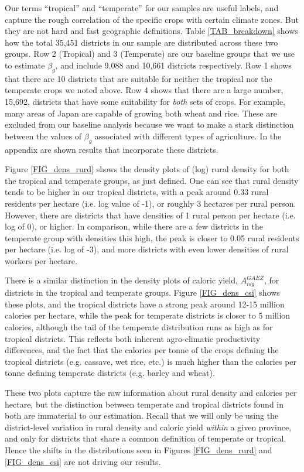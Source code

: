 \documentclass[11pt]{article}
\begin{document}
Our terms ``tropical'' and ``temperate'' for our samples are useful labels, and capture the rough correlation of the specific crops with certain climate zones. But they are not hard and fast geographic definitions. Table \ref{TAB_breakdown} shows how the total 35,451 districts in our sample are distributed across these two groups. Row 2 (Tropical) and 3 (Temperate) are our baseline groups that we use to estimate $\beta_g$, and include 9,088 and 10,661 districts respectively. Row 1 shows that there are 10 districts that are suitable for neither the tropical nor the temperate crops we noted above. Row 4 shows that there are a large number, 15,692, districts that have some suitability for \textit{both} sets of crops. For example, many areas of Japan are capable of growing both wheat and rice. These are excluded from our baseline analysis because we want to make a stark distinction between the values of $\beta_g$ associated with different types of agriculture. In the appendix are shown results that incorporate these districts.

Figure \ref{FIG_dens_rurd} shows the density plots of (log) rural density for both the tropical and temperate groups, as just defined. One can see that rural density tends to be higher in our tropical districts, with a peak around 0.33 rural residents per hectare (i.e. log value of -1), or roughly 3 hectares per rural person. However, there are districts that have densities of 1 rural person per hectare (i.e. log of 0), or higher. In comparison, while there are a few districts in the temperate group with densities this high, the peak is closer to 0.05 rural residents per hectare (i.e. log of -3), and more districts with even lower densities of rural workers per hectare. 

There is a similar distinction in the density plots of caloric yield, $A_{isg}^{GAEZ}$, for districts in the tropical and temperate groups. Figure \ref{FIG_dens_csi} shows these plots, and the tropical districts have a strong peak around 12-15 million calories per hectare, while the peak for temperate districts is closer to 5 million calories, although the tail of the temperate distribution runs as high as for tropical districts. This reflects both inherent agro-climatic productivity differences, and the fact that the calories per tonne of the crops defining the tropical districts (e.g. cassave, wet rice, etc.) is much higher than the calories per tonne defining temperate districts (e.g. barley and wheat). 

These two plots capture the raw information about rural density and calories per hectare, but the distinction between temperate and tropical districts found in both are immaterial to our estimation. Recall that we will only be using the district-level variation in rural density and caloric yield \textit{within} a given province, and only for districts that share a common definition of temperate or tropical. Hence the shifts in the distributions seen in Figures \ref{FIG_dens_rurd} and \ref{FIG_dens_csi} are not driving our results. 
\end{document}
